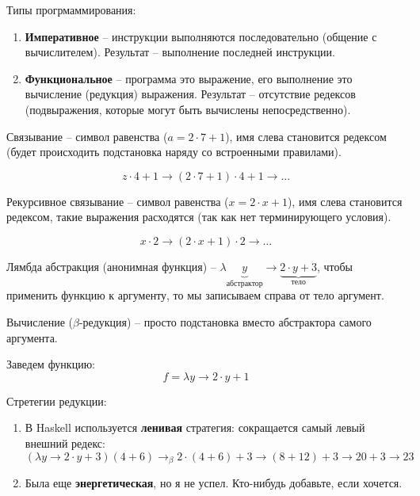 Типы прогрмаммирования:
\begin{enumerate}
    \item \textbf{Императивное} -- инструкции выполняются последовательно (общение с вычислителем). Результат -- выполнение последней инструкции.
    \item \textbf{Функциональное} -- программа это выражение, его выполнение это вычисление (редукция) выражения. Результат -- отсутствие редексов (подвыражения, которые могут быть вычислены непосредственно).
\end{enumerate}
\begin{definition}
    Связывание -- символ равенства ($a = 2 \cdot 7 + 1$), имя слева становится редексом (будет происходить подстановка наряду со встроенными правилами).
\end{definition}
\begin{example}
    $$
    z \cdot 4 + 1 \rightarrow (2 \cdot 7 + 1) \cdot 4 + 1 \rightarrow \dots
    $$
\end{example}

\begin{definition}
    Рекурсивное связывание -- символ равенства ($x = 2 \cdot x + 1$), имя слева становится редексом, такие выражения расходятся (так как нет терминирующего условия).
\end{definition}
\begin{example}
    $$
    x \cdot 2 \rightarrow (2 \cdot x + 1) \cdot 2 \rightarrow \dots
    $$
\end{example}

\begin{definition}
    Лямбда абстракция (анонимная функция) -- $\lambda \underbrace{y}_{\text{абстрактор}} \rightarrow \underbrace{2 \cdot y + 3}_{\text{тело}}$, чтобы применить функцию к аргументу, то мы записываем справа от тело аргумент.
\end{definition}

\begin{definition}
    Вычисление ($\beta$-редукция) -- просто подстановка вместо абстрактора самого аргумента.
\end{definition}

\begin{example}
    Заведем функцию:
    $$f = \lambda y \rightarrow 2 \cdot y + 1$$
\end{example}

Стретегии редукции:
\begin{enumerate}
    \item {
        В Haskell используется \textbf{ленивая} стратегия: сокращается самый левый внешний редекс: $(\lambda y \rightarrow 2 \cdot y + 3) (4 + 6) \rightarrow_{\beta} 2 \cdot (4 + 6) + 3 \rightarrow (8 + 12) + 3 \rightarrow 20 + 3 \rightarrow 23$
    }
    \item Была еще \textbf{энергетическая}, но я не успел. Кто-нибудь добавьте, если хочется.
\end{enumerate}

